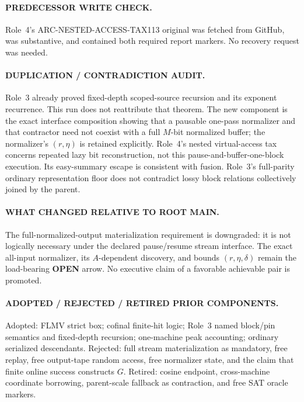 \documentclass[11pt]{article}
\newcommand{\OPEN}{\textbf{OPEN}}
\begin{document}
\paragraph{PREDECESSOR WRITE CHECK.}
Role~4's ARC-NESTED-ACCESS-TAX113 original was fetched from GitHub,
was substantive, and contained both required report markers.  No recovery
request was needed.

\paragraph{DUPLICATION / CONTRADICTION AUDIT.}
Role~3 already proved fixed-depth scoped-source recursion and its exponent
recurrence.  This run does not reattribute that theorem.  The new component
is the exact interface composition showing that a pausable one-pass
normalizer and that contractor need not coexist with a full \(M\)-bit
normalized buffer; the normalizer's \((r,\eta)\) is retained explicitly.
Role~4's nested virtual-access tax concerns repeated lazy bit reconstruction,
not this pause-and-buffer-one-block execution.  Its easy-summary escape is
consistent with fusion.  Role~3's full-parity ordinary representation floor
does not contradict lossy block relations collectively joined by the parent.

\paragraph{WHAT CHANGED RELATIVE TO ROOT MAIN.}
The full-normalized-output materialization requirement is downgraded: it is
not logically necessary under the declared pause/resume stream interface.
The exact all-input normalizer, its \(A\)-dependent discovery, and bounds
\((r,\eta,\delta)\) remain the load-bearing \OPEN{} arrow.  No executive claim
of a favorable achievable pair is promoted.

\paragraph{ADOPTED / REJECTED / RETIRED PRIOR COMPONENTS.}
Adopted: FLMV strict box; cofinal finite-hit logic; Role~3 named block/pin
semantics and fixed-depth recursion; one-machine peak accounting; ordinary
serialized descendants.  Rejected: full stream materialization as mandatory,
free replay, free output-tape random access, free normalizer state, and the
claim that finite online success constructs \(G\).  Retired: cosine endpoint,
cross-machine coordinate borrowing, parent-scale fallback as contraction,
and free SAT oracle markers.
\end{document}
